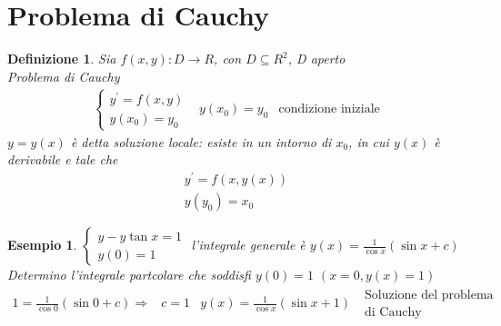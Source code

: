 \documentclass{book}
\newtheorem{defi}{Definizione}
\newtheorem{esempio}{Esempio}
\begin{document}
\section{Problema di Cauchy \label{pcauchy}}
\begin{defi}
  Sia $f(x,y):D\to R$, con $D \subseteq R^2$, D aperto\\
  Problema di Cauchy
  \begin{eqnarray*}
    \begin{cases}
      y^\prime=f(x,y)\\
      y(x_0)=y_0
      \end{cases} & y(x_0)=y_0 &\text{condizione iniziale}
  \end{eqnarray*}
  $y=y(x)$ è detta {\color{red}soluzione locale}: esiste in un intorno di $x_0$, in cui
  $y(x)$ è derivabile e tale che
  \begin{eqnarray*}
    y^\prime=f(x,y(x))\\
    y(y_0)=x_0
  \end{eqnarray*}
\end{defi}
\begin{esempio}
  $\begin{cases}
     y-y\tan x=1\\
     y(0)=1
   \end{cases}$ l'integrale generale è $y(x)=\frac{1}{\cos x}(\sin x+c)$\\
   Determino l'integrale partcolare che soddisfi $y(0)=1$ $(x=0,y(x)=1)$
   \begin{eqnarray*}
     1=\frac{1}{\cos 0} (\sin 0 +c) \Rightarrow &c=1 & y(x)=\frac{1}{\cos x}(\sin x+1)
     \text{ } \begin{matrix}
         \text{Soluzione del problema}\\
         \text{di Cauchy}
       \end{matrix}
   \end{eqnarray*}
\end{esempio}
\end{document}

